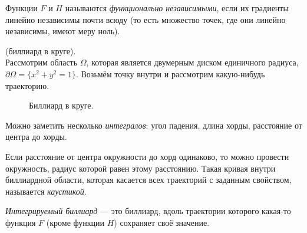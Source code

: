\begin{definition}
    Функции $F$ и $H$ называются \textit{функционально независимыми}, если их градиенты линейно независимы почти всюду (то есть множество точек, где они линейно независимы, имеют меру ноль).
\end{definition} 


\begin{example}(биллиард в круге).\\
    Рассмотрим область $\Omega$, которая является двумерным диском единичного радиуса, $\partial \Omega = \{x^2+y^2=1\}$. Возьмём точку внутри и рассмотрим какую-нибудь траекторию.

    \begin{figure}[ht]
        \centering
        \caption{Биллиард в круге.}
        \label{fig:c15.3}
    \end{figure}

    Можно заметить несколько \textit{интегралов}: угол падения, длина хорды, расстояние от центра до хорды.

    Если расстояние от центра окружности до хорд одинаково, то можно провести окружность, радиус которой равен этому расстоянию. Такая кривая внутри биллиардной области, которая касается всех траекторий с заданным свойством, называется \textit{каустикой}.
\end{example}

\begin{definition}
    \textit{Интегрируемый биллиард} — это биллиард, вдоль траектории которого какая-то функция $F$ (кроме функции $H$) сохраняет своё значение.
\end{definition} 

